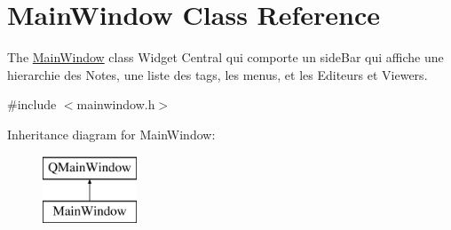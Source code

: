 \hypertarget{class_main_window}{\section{Main\-Window Class Reference}
\label{class_main_window}
}


The \hyperlink{class_main_window}{Main\-Window} class Widget Central qui comporte un side\-Bar qui affiche une hierarchie des Notes, une liste des tags, les menus, et les Editeurs et Viewers.  




{\ttfamily \#include $<$mainwindow.\-h$>$}

Inheritance diagram for Main\-Window\-:\begin{figure}[H]
\begin{center}
\leavevmode
\includegraphics[height=2.000000cm]{class_main_window}
\end{center}
\end{figure}
